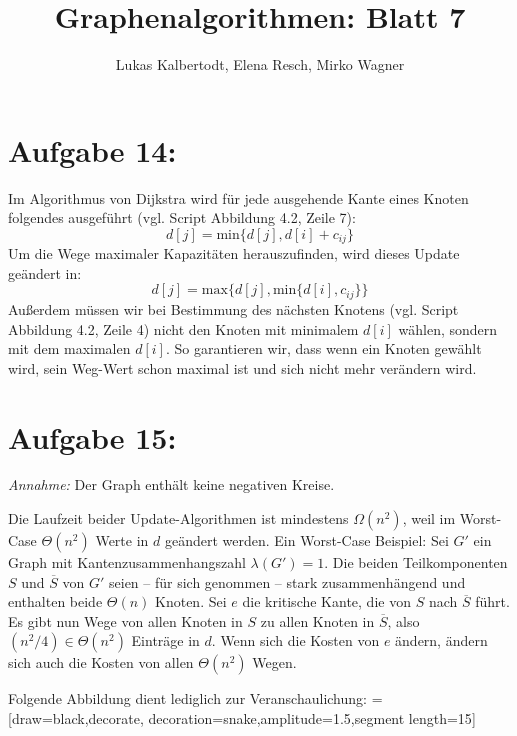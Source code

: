 \documentclass[11pt]{scrartcl} %
\title{Graphenalgorithmen: Blatt 7}
\author{Lukas Kalbertodt, Elena Resch, Mirko Wagner}
\begin{document}
\maketitle


\section*{Aufgabe 14:}

Im Algorithmus von Dijkstra wird für jede ausgehende Kante eines Knoten folgendes ausgeführt (vgl. Script Abbildung 4.2, Zeile 7):
\[d[j] = \text{min}\{d[j], d[i] + c_{ij}\}\]
Um die Wege maximaler Kapazitäten herauszufinden, wird dieses Update geändert in:
\[d[j] = \text{max}\{d[j], \text{min}\{d[i], c_{ij}\}\}\]
Außerdem müssen wir bei Bestimmung des nächsten Knotens (vgl. Script Abbildung 4.2, Zeile 4) nicht den Knoten mit minimalem $d[i]$ wählen, sondern mit dem maximalen $d[i]$. So garantieren wir, dass wenn ein Knoten gewählt wird, sein Weg-Wert schon maximal ist und sich nicht mehr verändern wird.

\section*{Aufgabe 15:}
\emph{Annahme:} Der Graph enthält keine negativen Kreise.

Die Laufzeit beider Update-Algorithmen ist mindestens $\Omega (n^2)$, weil im Worst-Case $\Theta (n^2)$ Werte in $d$ geändert werden. Ein Worst-Case Beispiel: Sei $G'$ ein Graph mit Kantenzusammenhangszahl $\lambda(G') = 1$. Die beiden Teilkomponenten $S$ und $\overline{S}$ von $G'$ seien -- für sich genommen -- stark zusammenhängend und enthalten beide $\Theta (n)$ Knoten. Sei $e$ die kritische Kante, die von $S$ nach $\overline{S}$ führt. Es gibt nun Wege von allen Knoten in $S$ zu allen Knoten in $\overline{S}$, also $(n^2/4) \in \Theta (n^2)$ Einträge in $d$. Wenn sich die Kosten von $e$ ändern, ändern sich auch die Kosten von allen $\Theta (n^2)$ Wegen.

\newpage
Folgende Abbildung dient lediglich zur Veranschaulichung:
 = [draw=black,decorate, decoration={snake,amplitude=1.5,segment length=15}]
\begin{center}
    \\[0.5cm]
\end{center}
\end{document}
